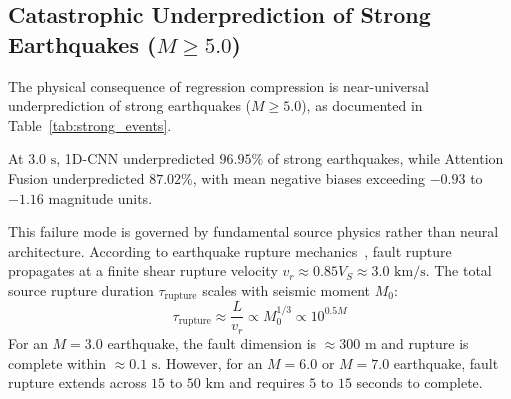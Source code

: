 \documentclass[journal]{IEEEtran}
\begin{document}
\subsection{Catastrophic Underprediction of Strong Earthquakes ($M \ge 5.0$)}
The physical consequence of regression compression is near-universal underprediction of strong earthquakes ($M \ge 5.0$), as documented in Table~\ref{tab:strong_events}.

\begin{table}[t]
\caption{Systematic Underprediction of Strong Earthquakes ($M \ge 5.0$, $N_{\text{strong}} = 131$)}
\label{tab:strong_events}
\centering
\footnotesize
{}
\end{table}

At $3.0\text{ s}$, 1D-CNN underpredicted $96.95\%$ of strong earthquakes, while Attention Fusion underpredicted $87.02\%$, with mean negative biases exceeding $-0.93$ to $-1.16$ magnitude units.

This failure mode is governed by fundamental source physics rather than neural architecture. According to earthquake rupture mechanics~\cite{brune1970tectonic, kanamori2005real}, fault rupture propagates at a finite shear rupture velocity $v_r \approx 0.85 V_S \approx 3.0\text{ km/s}$. The total source rupture duration $\tau_{\text{rupture}}$ scales with seismic moment $M_0$:
\begin{equation}
\tau_{\text{rupture}} \approx \frac{L}{v_r} \propto M_0^{1/3} \propto 10^{0.5 M}
\label{eq:rupture_duration}
\end{equation}
For an $M = 3.0$ earthquake, the fault dimension is $\approx 300\text{ m}$ and rupture is complete within $\approx 0.1\text{ s}$. However, for an $M = 6.0$ or $M = 7.0$ earthquake, fault rupture extends across $15$ to $50\text{ km}$ and requires $5$ to $15$ seconds to complete. 
\end{document}
